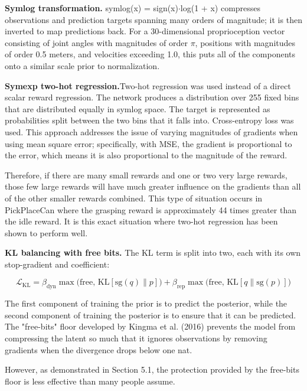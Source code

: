 \documentclass[12pt,a4paper,oneside]{report}
\begin{document}
\textbf{Symlog transformation.} symlog(x) = sign(x)$\cdot$log(1 + \textbar x\textbar) compresses observations and prediction targets spanning many orders of magnitude; it is then inverted to map predictions back. For a 30-dimensional proprioception vector consisting of joint angles with magnitudes of order $\pi$, positions with magnitudes of order 0.5 meters, and velocities exceeding 1.0, this puts all of the components onto a similar scale prior to normalization.

\textbf{Symexp two-hot regression.}Two-hot regression was used instead of a direct scalar reward regression. The network produces a distribution over 255 fixed bins that are distributed equally in symlog space. The target is represented as probabilities split between the two bins that it falls into. Cross-entropy loss was used. This approach addresses the issue of varying magnitudes of gradients when using mean square error; specifically, with MSE, the gradient is proportional to the error, which means it is also proportional to the magnitude of the reward.

Therefore, if there are many small rewards and one or two very large rewards, those few large rewards will have much greater influence on the gradients than all of the other smaller rewards combined. This type of situation occurs in PickPlaceCan where the grasping reward is approximately 44 times greater than the idle reward. It is this exact situation where two-hot regression has been shown to perform well. 

\textbf{KL balancing with free bits.} The KL term is split into two, each with its
own stop-gradient and coefficient:

\begin{equation*}
\mathcal{L}_{\mathrm{KL}} = \beta_{\mathrm{dyn}}\max\!\bigl(\text{free},\,\mathrm{KL}[\mathrm{sg}(q)\|p]\bigr) + \beta_{\mathrm{rep}}\max\!\bigl(\text{free},\,\mathrm{KL}[q\|\mathrm{sg}(p)]\bigr)
\end{equation*}

The first component of training the prior is to predict the posterior, while the second component of training the posterior is to ensure that it can be predicted. The "free-bits" floor developed by Kingma et al. (2016) prevents the model from compressing the latent so much that it ignores observations by removing gradients when the divergence drops below one nat.

However, as demonstrated in Section 5.1, the protection provided by the free-bits floor is less effective than many people assume.
\end{document}
